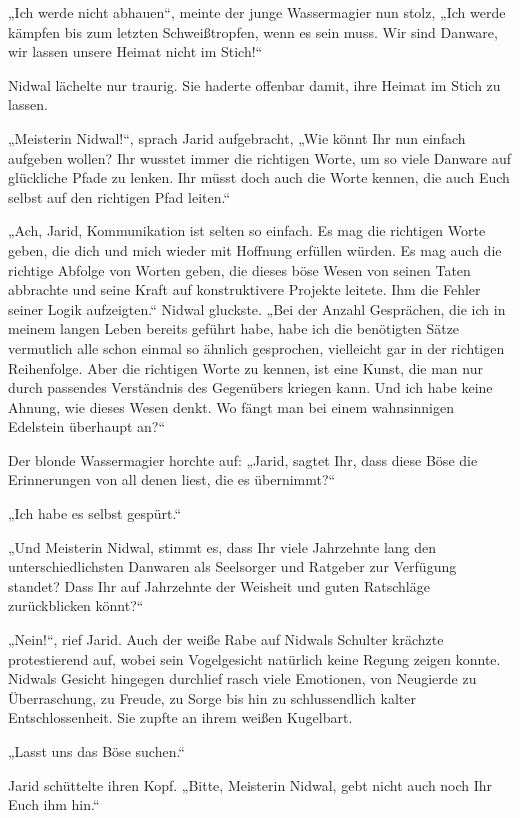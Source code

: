 „Ich werde nicht abhauen“, meinte der junge Wassermagier nun stolz, „Ich werde kämpfen bis zum letzten Schweißtropfen, wenn es sein muss. Wir sind Danware, wir lassen unsere Heimat nicht im Stich!“

Nidwal lächelte nur traurig. Sie haderte offenbar damit, ihre Heimat im Stich zu lassen.

„Meisterin Nidwal!“, sprach Jarid aufgebracht, „Wie könnt Ihr nun einfach aufgeben wollen? Ihr wusstet immer die richtigen Worte, um so viele Danware auf glückliche Pfade zu lenken. Ihr müsst doch auch die Worte kennen, die auch Euch selbst auf den richtigen Pfad leiten.“

„Ach, Jarid, Kommunikation ist selten so einfach. Es mag die richtigen Worte geben, die dich und mich wieder mit Hoffnung erfüllen würden. Es mag auch die richtige Abfolge von Worten geben, die dieses böse Wesen von seinen Taten abbrachte und seine Kraft auf konstruktivere Projekte leitete. Ihm die Fehler seiner Logik aufzeigten.“ Nidwal gluckste. „Bei der Anzahl Gesprächen, die ich in meinem langen Leben bereits geführt habe, habe ich die benötigten Sätze vermutlich alle schon einmal so ähnlich gesprochen, vielleicht gar in der richtigen Reihenfolge. Aber die richtigen Worte zu kennen, ist eine Kunst, die man nur durch passendes Verständnis des Gegenübers kriegen kann. Und ich habe keine Ahnung, wie dieses Wesen denkt. Wo fängt man bei einem wahnsinnigen Edelstein überhaupt an?“

Der blonde Wassermagier horchte auf: „Jarid, sagtet Ihr, dass diese Böse die Erinnerungen von all denen liest, die es übernimmt?“

„Ich habe es selbst gespürt.“

„Und Meisterin Nidwal, stimmt es, dass Ihr viele Jahrzehnte lang den unterschiedlichsten Danwaren als Seelsorger und Ratgeber zur Verfügung standet? Dass Ihr auf Jahrzehnte der Weisheit und guten Ratschläge zurückblicken könnt?“

„Nein!“, rief Jarid. Auch der weiße Rabe auf Nidwals Schulter krächzte protestierend auf, wobei sein Vogelgesicht natürlich keine Regung zeigen konnte. Nidwals Gesicht hingegen durchlief rasch viele Emotionen, von Neugierde zu Überraschung, zu Freude, zu Sorge bis hin zu schlussendlich kalter Entschlossenheit. Sie zupfte an ihrem weißen Kugelbart.

„Lasst uns das Böse suchen.“

Jarid schüttelte ihren Kopf. „Bitte, Meisterin Nidwal, gebt nicht auch noch Ihr Euch ihm hin.“

